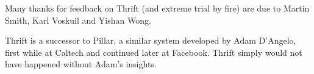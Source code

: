 \documentclass[nocopyrightspace,blockstyle]{sigplanconf}
\begin{document}
\acks

Many thanks for feedback on Thrift (and extreme trial by fire) are due to
Martin Smith, Karl Voskuil and Yishan Wong.

Thrift is a successor to Pillar, a similar system developed
by Adam D'Angelo, first while at Caltech and continued later at Facebook.
Thrift simply would not have happened without Adam's insights.



\end{document}
